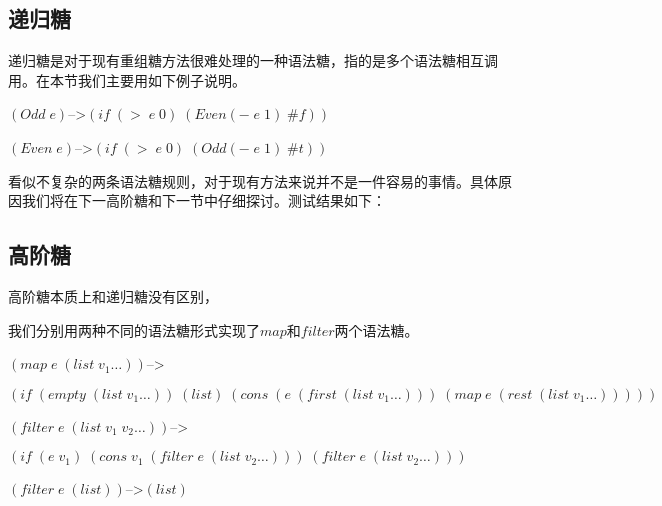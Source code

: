 \subsection{递归糖}

递归糖是对于现有重组糖方法很难处理的一种语法糖，指的是多个语法糖相互调用。在本节我们主要用如下例子说明。

$(Odd\;e)$-->$(if\;(>\;e\;0)\;(Even (-\;e\;1)\;\#f))$

$(Even\;e)$-->$(if\;(>\;e\;0)\;(Odd (-\;e\;1)\;\#t))$

看似不复杂的两条语法糖规则，对于现有方法来说并不是一件容易的事情。具体原因我们将在下一高阶糖和下一节中仔细探讨。测试结果如下：

\subsection{高阶糖}

高阶糖本质上和递归糖没有区别，

我们分别用两种不同的语法糖形式实现了$map$和$filter$两个语法糖。
\begin{flushleft}
	$(map\;e\;(list\;v_1\ldots))$-->
	
	$(if\;(empty\;(list\;v_1\ldots))\;(list)\;(cons\;(e\;(first\;(list\;v_1\ldots)))\;(map\;e\;(rest\;(list\;v_1\ldots)))))$
\end{flushleft}

\begin{flushleft}
	$(filter\;e\;(list\;v_1\;v_2\ldots))$-->
	
	$(if\;(e\;v_1)\;(cons\;v_1\;(filter\;e\;(list\;v_2\ldots)))\;(filter\;e\;(list\;v_2\ldots)))$
	
	$(filter\;e\;(list))$-->$(list)$
\end{flushleft}

